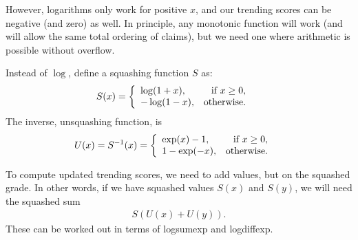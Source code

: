 \documentclass[a4paper, 12pt]{article}
\begin{document}
However,
logarithms only work for positive $x$, and our trending scores can be
negative (and zero) as well. In principle, any monotonic function will work
(and will allow the same total ordering of claims),
but we need one where arithmetic is possible without overflow.

Instead of $\log$, define a squashing function $S$ as:
\begin{align}
S(x) &=
    \left\{
        \begin{array}{lr}
            \log (1 + x), & \textnormal{if } x \geq 0, \\
            -\log(1 - x), & \textnormal{otherwise}.
        \end{array}
    \right.
\end{align}
The inverse, unsquashing function, is
\begin{align}
U(x) = S^{-1}(x) &=
    \left\{
        \begin{array}{lr}
            \exp(x) - 1,  & \textnormal{if } x \geq 0, \\
            1 - \exp(-x), & \textnormal{otherwise}.
        \end{array}
    \right.
\end{align}

To compute updated trending scores, we need to add values, but on the
squashed grade. In other words, if we have squashed values $S(x)$ and
$S(y)$, we will need the squashed sum
\begin{align}
S(U(x) + U(y)).
\end{align}
These can be worked out in terms of logsumexp and logdiffexp.
\end{document}
